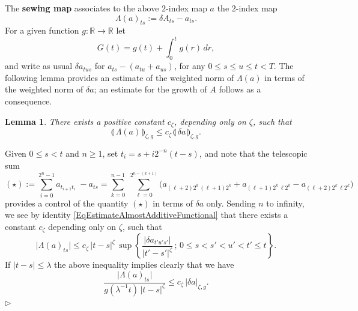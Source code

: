 \documentclass[11pt,a4paper]{amsart}
\newcommand{\RR}{\mathbb{R}}  \newcommand{\CC}{\mathbb{C}}  \newcommand{\LL}{\mathbb{L}}  \newcommand{\WW}{\mathbb{W}}
\renewcommand{\leq}{\leqslant}
\renewcommand{\geq}{\geqslant}
\newcommand{\ssk}{\smallskip}
\newtheorem{lem}[thm]{\hspace{-0.15cm}  {\sc Lemma} }%
\numberwithin{equation}{section} %
\newenvironment{Dem}{%
    \begin{list}{\hspace{0.5cm}{\sc Proof --}}{%
        \setlength{\topsep}{0pt}%
        \setlength{\leftmargin}{0pt}%
        \setlength{\rightmargin}{0pt}%
        \setlength{\listparindent}{0pt}%
        \setlength{\itemindent}{0pt}%
        \setlength{\parsep}{0pt}%
        \addtolength{\leftmargin}{20pt}%
        \addtolength{\rightmargin}{0pt}%
    } \item }{\hfill{\space $\rhd$}\end{list}\smallskip}
\begin{document}
\ssk

The \textbf{sewing map} associates to the above $2$-index map $a$ the $2$-index map
$$
\Lambda(a)_{ts} := \delta A_{ts} - a_{ts}.
$$
For a given function $g:\RR\to\RR$ let 
$$
G(t) = g(t) + \int_0^t g(r)\,dr,
$$
and write as usual  $\delta a_{tus}$ for $a_{ts} - (a_{tu}+a_{us})$, for any $0\leq s\leq u\leq t<T$. The following lemma provides an estimate of the weighted norm of $\Lambda(a)$ in terms of the weighted norm of $\delta a$; an estimate for the growth of $A$ follows as a consequence. 

\begin{lem}
\label{LemmaSewingMap}
There exists a positive constant $c_\zeta$, depending only on $\zeta$, such that 
$$
\llparenthesis\,\Lambda(a)\,\rrparenthesis_{\zeta,g} \leq c_\zeta \, \llparenthesis\,\delta a\,\rrparenthesis_{\zeta,g}.
$$
\end{lem}

\medskip

\begin{Dem}
Given $0\leq s<t$ and $n\geq 1$, set $t_i = s+i2^{-n}(t-s)$, and note that the telescopic sum
\begin{equation*}
(\star) := \sum_{i=0}^{2^n-1}a_{t_{i+1}t_i}\; - a_{ts} = \sum_{k=0}^{n-1}\;\sum_{\ell=0}^{2^{n-(k+1)}} \Big(a_{(\ell+2)2^k\,(\ell+1)2^k}+a_{(\ell+1)2^k\,\ell2^k} - a_{(\ell+2)2^k\,\ell2^k} \Big)
\end{equation*}
provides a control of the quantity $(\star)$ in terms of $\delta a$ only. Sending $n$ to infinity, we see by identity \eqref{EqEstimateAlmostAdditiveFunctional} that there exists a constant $c_\zeta$ depending only on $\zeta$, such that 
$$
\big| \Lambda(a)_{ts} \big| \leq c_\zeta \, |t-s|^\zeta \,\sup\left\{\frac{\big|\delta a_{t'u's'}\big|}{|t'-s'|^\zeta}\,;\,0\leq s<s'<u'<t'\leq t\right\}.
$$
If $|t-s| \leq \lambda$ the above inequality implies clearly that we have
\begin{equation}
\label{EqEstimateLambdaA}
\frac{\big| \Lambda(a)_{ts} \big|}{g(\lambda^{-1} t)\,|t-s|^\zeta} \leq c_\zeta \, \big|\delta a\big|_{\zeta,g}.
\end{equation}
\end{Dem}

\medskip
\end{document}

